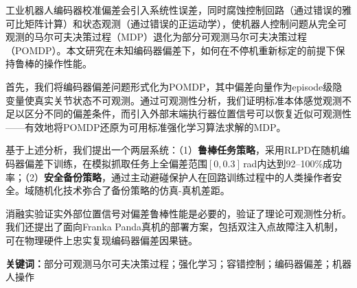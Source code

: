 
工业机器人编码器校准偏差会引入系统性误差，同时腐蚀控制回路（通过错误的雅可比矩阵计算）和状态观测（通过错误的正运动学），使机器人控制问题从完全可观测的马尔可夫决策过程（MDP）退化为部分可观测马尔可夫决策过程（POMDP）。本文研究在未知编码器偏差下，如何在不停机重新标定的前提下保持鲁棒的操作性能。

首先，我们将编码器偏差问题形式化为POMDP，其中偏差向量作为episode级隐变量使真实关节状态不可观测。通过可观测性分析，我们证明标准本体感觉观测不足以区分不同的偏差条件，而引入外部末端执行器位置信号可以恢复近似可观测性——有效地将POMDP还原为可用标准强化学习算法求解的MDP。

基于上述分析，我们提出一个两层系统：（1）\textbf{鲁棒任务策略}，采用RLPD在随机编码器偏差下训练，在模拟抓取任务上全偏差范围$[0, 0.3]$\,rad内达到92--100\%成功率；（2）\textbf{安全备份策略}，通过主动避碰保护人在回路训练过程中的人类操作者安全。域随机化技术弥合了备份策略的仿真-真机差距。

消融实验证实外部位置信号对偏差鲁棒性能是必要的，验证了理论可观测性分析。我们还提出了面向Franka Panda真机的部署方案，包括双注入点故障注入机制，可在物理硬件上忠实复现编码器偏差因果链。

\vspace{1em}
\noindent\textbf{关键词：}部分可观测马尔可夫决策过程；强化学习；容错控制；编码器偏差；机器人操作
